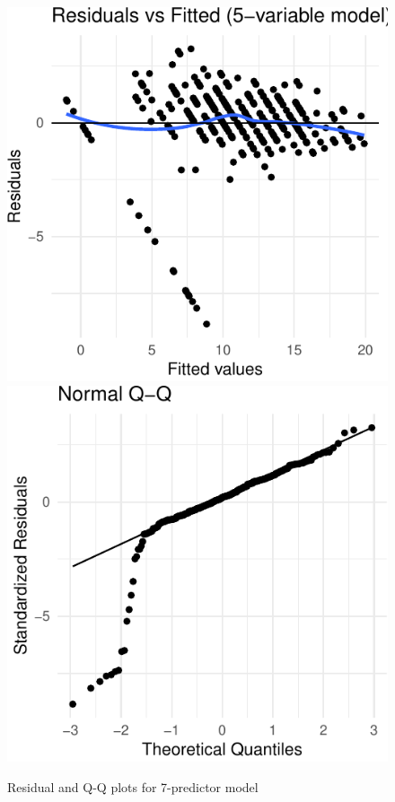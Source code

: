 \documentclass[a4paper,9pt,twocolumn,twoside,]{pinp}
\begin{document}
\begin{figure}[htbp]

{\centering \includegraphics[width=0.45\linewidth]{Executive-summary_files/figure-latex/resid-qq-7var-1} \includegraphics[width=0.45\linewidth]{Executive-summary_files/figure-latex/resid-qq-7var-2} 

}

\caption{Residual and Q-Q plots for 7-predictor model}\label{fig:resid-qq-7var}
\end{figure}
\end{document}
